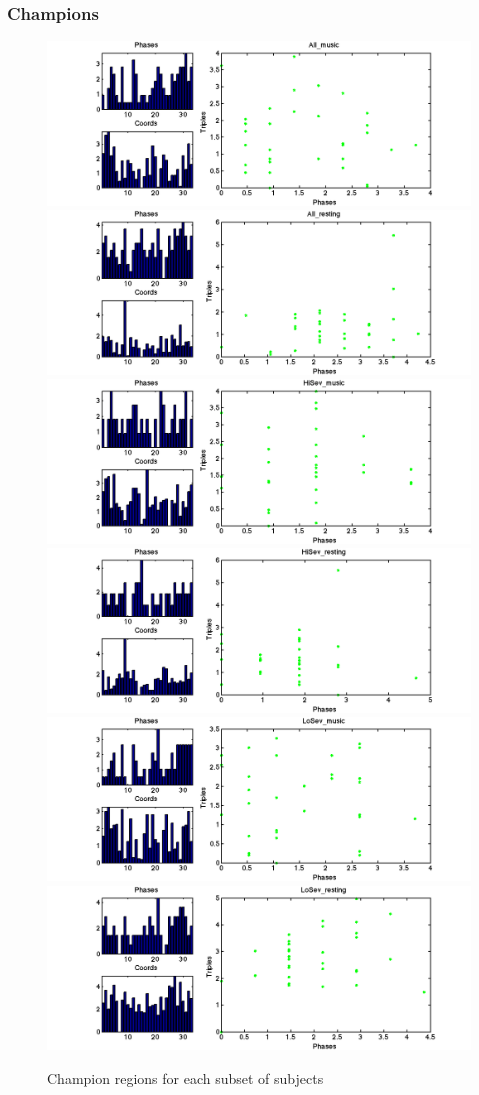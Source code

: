 \documentclass[11pt]{article}
\begin{document}
\subsubsection{Champions}
\begin{figure}[H]
\includegraphics[width=.49\textwidth]{pictures/041916/scatter_n10_All_music.png}
\includegraphics[width=.49\textwidth]{pictures/041916/scatter_n10_All_resting.png}
\includegraphics[width=.49\textwidth]{pictures/041916/scatter_n10_HiSev_music.png}
\includegraphics[width=.49\textwidth]{pictures/041916/scatter_n10_HiSev_resting.png}
\includegraphics[width=.49\textwidth]{pictures/041916/scatter_n10_LoSev_music.png}
\includegraphics[width=.49\textwidth]{pictures/041916/scatter_n10_LoSev_resting.png}
\caption{Champion regions for each subset of subjects}
\end{figure}
\end{document}
